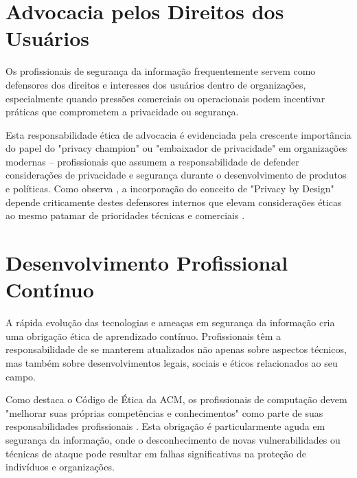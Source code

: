 \section{Advocacia pelos Direitos dos Usuários}

Os profissionais de segurança da informação frequentemente servem como defensores dos direitos e interesses dos usuários dentro de organizações, especialmente quando pressões comerciais ou operacionais podem incentivar práticas que comprometem a privacidade ou segurança.

Esta responsabilidade ética de advocacia é evidenciada pela crescente importância do papel do "privacy champion" ou "embaixador de privacidade" em organizações modernas – profissionais que assumem a responsabilidade de defender considerações de privacidade e segurança durante o desenvolvimento de produtos e políticas. Como observa \citeauthor{cavoukian2009privacy}, a incorporação do conceito de "Privacy by Design" depende criticamente destes defensores internos que elevam considerações éticas ao mesmo patamar de prioridades técnicas e comerciais \cite{cavoukian2009privacy}.

\section{Desenvolvimento Profissional Contínuo}

A rápida evolução das tecnologias e ameaças em segurança da informação cria uma obrigação ética de aprendizado contínuo. Profissionais têm a responsabilidade de se manterem atualizados não apenas sobre aspectos técnicos, mas também sobre desenvolvimentos legais, sociais e éticos relacionados ao seu campo.

Como destaca o Código de Ética da ACM, os profissionais de computação devem "melhorar suas próprias competências e conhecimentos" como parte de suas responsabilidades profissionais \cite{acm2018}. Esta obrigação é particularmente aguda em segurança da informação, onde o desconhecimento de novas vulnerabilidades ou técnicas de ataque pode resultar em falhas significativas na proteção de indivíduos e organizações. 